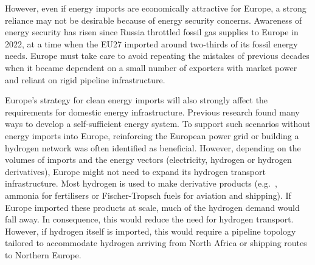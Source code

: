 \documentclass[5p,10pt]{elsarticle}
\begin{document}

However, even if energy imports are economically attractive for Europe, a strong
reliance may not be desirable because of energy security concerns. Awareness of
energy security has risen since Russia throttled fossil gas supplies to Europe
in 2022,\cite{pedersenLongtermImplications2022} at a time when the EU27 imported
around two-thirds of its fossil energy needs.\cite{eurostatCompleteEnergy2023}
Europe must take care to avoid repeating the mistakes of previous decades when
it became dependent on a small number of exporters with market power and reliant
on rigid pipeline infrastructure.


Europe's strategy for clean energy imports will also strongly affect the
requirements for domestic energy infrastructure. Previous research found many
ways to develop a self-sufficient energy
system.\cite{pickeringDiversityOptions2022,trondleHomemadeImported2019,brownSynergiesSector2018}
To support such scenarios without energy imports into Europe, reinforcing the
European power grid or building a hydrogen network was often identified as
beneficial.\cite{neumannPotentialRole2023,victoriaSpeedTechnological2022}
However, depending on the volumes of imports and the energy vectors
(electricity, hydrogen or hydrogen derivatives), Europe might not need to expand
its hydrogen transport infrastructure. Most hydrogen is used to make derivative
products (e.g.~, ammonia for fertilisers or Fischer-Tropsch fuels for aviation
and shipping).\cite{neumannPotentialRole2023} If Europe imported these products
at scale, much of the hydrogen demand would fall away. In consequence, this
would reduce the need for hydrogen transport. However, if hydrogen itself is
imported, this would require a pipeline topology tailored to accommodate
hydrogen arriving from North Africa or shipping routes to Northern
Europe.

\end{document}
